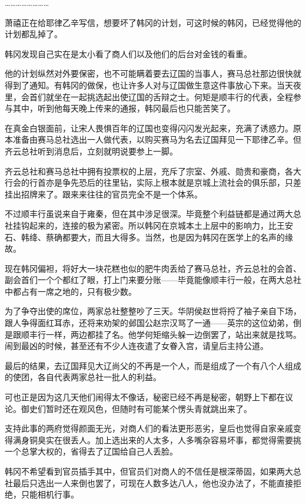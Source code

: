 ……………………

萧禧正在给耶律乙辛写信，想要坏了韩冈的计划，可这时候的韩冈，已经觉得他的计划都乱掉了。

韩冈发现自己实在是太小看了商人们以及他们的后台对金钱的看重。

他的计划纵然对外要保密，也不可能瞒着要去辽国的当事人，赛马总社那边很快就得到了通知。有韩冈的做保，也让许多人对与辽国做生意这件事放心下来。当天夜里，会首们就坐在一起挑选起出使辽国的舌辩之士。何矩是顺丰行的代表，全程参与其中，听到他每天晚上传来的通报，韩冈最后也只能苦笑了。

在真金白银面前，让宋人畏惧百年的辽国也变得闪闪发光起来，充满了诱惑力。原本准备由赛马总社选出一人做代表，以购买赛马为名去辽国拜见一下耶律乙辛。但齐云总社听到消息后，立刻就明说要参上一脚。

齐云总社和赛马总社中拥有投票权的上层，充斥了宗室、外戚、勋贵和豪商，各大行会的行首亦是争先恐后的往里钻，实际上根本就是京城上流社会的俱乐部，只差挂出招牌来了。跟来来往往的官员完全不是一个体系。

不过顺丰行虽说来自于雍秦，但在其中涉足很深。毕竟整个利益链都是通过两大总社挂钩起来的，连接的极为紧密。所以韩冈在京城本土上层中的影响力，比王安石、韩绛、蔡确都要大，而且大得多。当然，也是因为韩冈在医学上的名声的缘故。

现在韩冈偏袒，将好大一块花糕也似的肥牛肉丢给了赛马总社，齐云总社的会首、副会首们一个个都红了眼，打上门来要分账——毕竟能像顺丰行一般，在两大总社中都占有一席之地的，只有极少数。

为了争夺出使的席位，两家总社整整吵了三天。华阴侯赵世将捋了袖子亲自下场，跟人争得面红耳赤，还将来劝架的邺国公赵宗汉骂了一通——英宗的这位幼弟，倒是跟顺丰行一样，两边都挂了名。他学何矩缩头躲一边倒罢了，站出来就是找骂。闹到最凶的时候，甚至还有不少人连夜遣了女眷入宫，请皇后主持公道。

最后的结果，去辽国拜见大辽尚父的不再是一个人，而是组成了一个有八个人组成的使团，各自代表两家总社一批人的利益。

可也正是因为这几天他们闹得太不像话，秘密已经不再是秘密，朝野上下都在议论。御史们暂时还在观风色，但随时有可能某个愣头青就跳出来了。

支持此事的两府觉得颜面无光，对商人们的看法更形恶劣，皇后也觉得自家亲戚变得满身铜臭实在很丢人。加上选出来的人太多，人多嘴杂容易坏事，都觉得需要挑一个总掌大权的，省得去了辽国给自己人丢脸。

韩冈不希望看到官员插手其中，但官员们对商人的不信任是根深蒂固，如果两大总社最后只选出一人来倒也罢了，可现在人数多达八人，他也没办法了，不能直接拒绝，只能相机行事。

